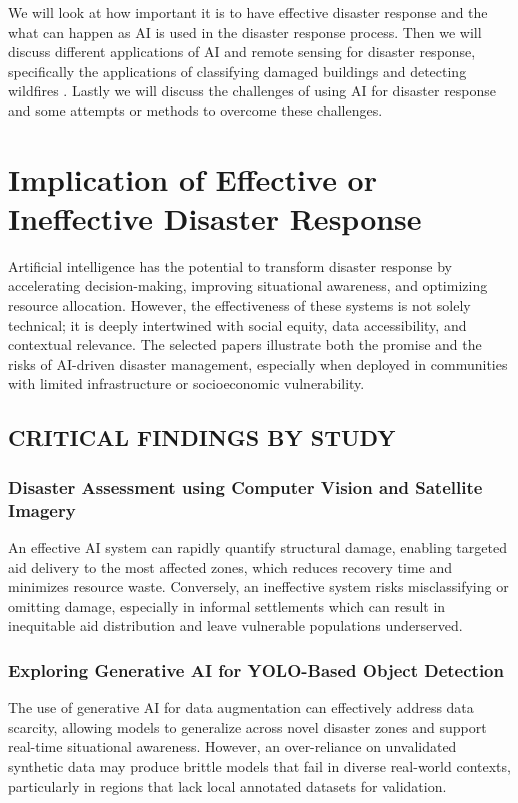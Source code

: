 \documentclass[conference,a4paper]{IEEEtran}
\begin{document}
We will look at how important it is to have effective disaster response and the what can happen as AI is used in the disaster response process. Then we will discuss different applications of AI and remote sensing for disaster response, specifically the applications of classifying damaged buildings \cite{kimDisasterAssessmentUsing2022,teohExploringGenerativeAI2024,lagapEnhancingPostDisasterDamage2025} and detecting wildfires \cite{elbohy2025fusion,jiaoForestFirePatterns2023}. Lastly we will discuss the challenges of using AI for disaster response and some attempts or methods to overcome these challenges.

\section{Implication of Effective or Ineffective Disaster Response}

Artificial intelligence has the potential to transform disaster response by accelerating decision-making, improving situational awareness, and optimizing resource allocation. However, the effectiveness of these systems is not solely technical; it is deeply intertwined with social equity, data accessibility, and contextual relevance. The selected papers illustrate both the promise and the risks of AI-driven disaster management, especially when deployed in communities with limited infrastructure or socioeconomic vulnerability.

\subsection{CRITICAL FINDINGS BY STUDY}

\subsubsection{Disaster Assessment using Computer Vision and Satellite Imagery}
An effective AI system can rapidly quantify structural damage, enabling targeted aid delivery to the most affected zones, which reduces recovery time and minimizes resource waste. Conversely, an ineffective system risks misclassifying or omitting damage, especially in informal settlements which can result in inequitable aid distribution and leave vulnerable populations underserved.

\subsubsection{Exploring Generative AI for YOLO-Based Object Detection}
The use of generative AI for data augmentation can effectively address data scarcity, allowing models to generalize across novel disaster zones and support real-time situational awareness. However, an over-reliance on unvalidated synthetic data may produce brittle models that fail in diverse real-world contexts, particularly in regions that lack local annotated datasets for validation.
\end{document}
